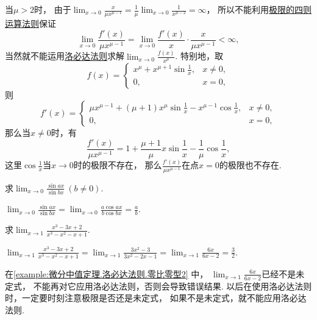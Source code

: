 \begin{example}
\begin{solution}
当\(\mu>2\)时，
由于\(\lim_{x\to0} \frac{x}{\mu x^{\mu-1}}
= \frac1\mu \lim_{x\to0} \frac1{x^{\mu-2}}
= \infty\)，
所以不能利用\hyperref[theorem:极限.极限的四则运算法则]{极限的四则运算法则}保证\begin{equation*}
	\lim_{x\to0} \frac{f'(x)}{\mu x^{\mu-1}}
	= \lim_{x\to0} \frac{f'(x)}{x} \cdot \frac{x}{\mu x^{\mu-1}}
	< \infty,
\end{equation*}
当然就不能运用\hyperref[theorem:微分中值定理.洛必达法则1]{洛必达法则}求解\(\lim_{x\to0} \frac{f(x)}{x^\mu}\).
特别地，取\begin{equation*}
	f(x) = \left\{ \begin{array}{cl}
		x^\mu + x^{\mu+1} \sin\frac1x, & x\neq0, \\
		0, & x=0,
	\end{array} \right.
\end{equation*}
则\begin{equation*}
	f'(x) = \left\{ \begin{array}{cl}
		\mu x^{\mu-1} + (\mu+1) x^\mu \sin\frac1x - x^{\mu-1} \cos\frac1x, & x\neq0, \\
		0, & x=0,
	\end{array} \right.
\end{equation*}
那么当\(x\neq0\)时，有\begin{equation*}
	\frac{f'(x)}{\mu x^{\mu-1}}
	= 1 + \frac{\mu+1}\mu x \sin\frac1x - \frac1\mu \cos\frac1x,
\end{equation*}
这里\(\cos\frac1x\)当\(x\to0\)时的极限不存在，
那么\(\frac{f'(x)}{\mu x^{\mu-1}}\)在点\(x=0\)的极限也不存在.
\end{solution}
\end{example}

\begin{example}
求\(\lim_{x\to0} \frac{\sin ax}{\sin bx}\ (b \neq 0)\).
\begin{solution}
\(\lim_{x\to0} \frac{\sin ax}{\sin bx}
= \lim_{x\to0} \frac{a \cos ax}{b \cos bx}
= \frac{a}{b}\).
\end{solution}
\end{example}

\begin{example}\label{example:微分中值定理.洛必达法则.零比零型2}
求\(\lim_{x\to1} \frac{x^3-3x+2}{x^3-x^2-x+1}\).
\begin{solution}
\(\lim_{x\to1} \frac{x^3-3x+2}{x^3-x^2-x+1}
= \lim_{x\to1} \frac{3x^2-3}{3x^2-2x-1}
= \lim_{x\to1} \frac{6x}{6x-2}
= \frac32\).
\end{solution}
\end{example}
\begin{remark}
在\cref{example:微分中值定理.洛必达法则.零比零型2} 中，
\(\lim_{x\to1} \frac{6x}{6x-2}\)已经不是未定式，
不能再对它应用洛必达法则，否则会导致错误结果.
以后在使用洛必达法则时，一定要时刻注意极限是否还是未定式，
如果不是未定式，就不能应用洛必达法则.
\end{remark}

